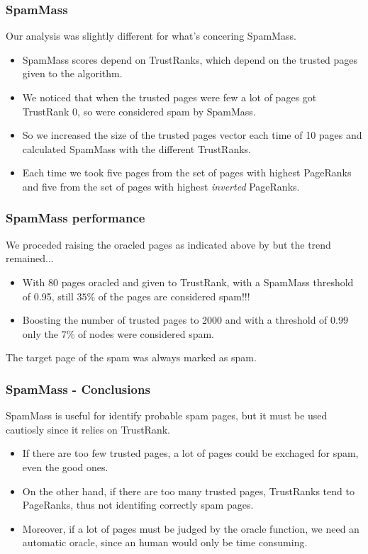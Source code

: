 \documentclass{beamer}
\begin{document}
\begin{frame}
\frametitle{SpamMass}
Our analysis was slightly different for what's concering SpamMass. 
\begin{itemize}
\item SpamMass scores depend on TrustRanks, which depend on the trusted pages given to the algorithm.
\item We noticed that when the trusted pages were few a lot of pages got TrustRank 0, so were considered spam by SpamMass.
\item So we increased the size of the trusted pages vector each time of 10 pages and calculated SpamMass with the different TrustRanks.
\item Each time we took five pages from the set of pages with highest PageRanks and five from the set of pages with highest \emph{inverted} PageRanks.
\end{itemize}
\end{frame}

\begin{frame}
\frametitle{SpamMass performance}
We proceded raising the oracled pages as indicated above by but the trend remained...
\begin{itemize}
\item With 80 pages oracled and given to TrustRank, with a SpamMass threshold of 0.95, still \alert{$35\%$} of the pages are considered spam!!!
\item Boosting the number of trusted pages to 2000 and with a threshold of $0.99$ only the $7\%$ of nodes were considered spam.
\end{itemize}
\vfill
The target page of the spam was always marked as spam.
\end{frame}

\begin{frame}
\frametitle{SpamMass - Conclusions}
SpamMass is useful for identify probable spam pages, but it must be used cautiosly since it relies on TrustRank.
\begin{itemize}
\item If there are too few trusted pages, a lot of pages could be exchaged for spam, even the good ones.
\item On the other hand, if there are too many trusted pages, TrustRanks tend to PageRanks, thus not identifing correctly spam pages.
\item Moreover, if a lot of pages must be judged by the oracle function, we need an automatic oracle, since an human would only be time consuming.
\end{itemize}
\end{frame}
\end{document}
